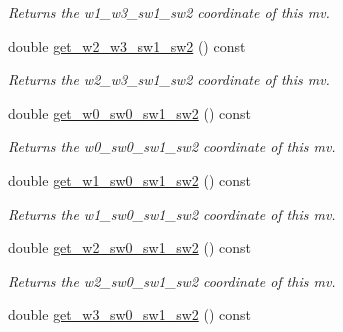 \begin{DoxyCompactItemize}
\begin{DoxyCompactList}\small\item\em Returns the w1\-\_\-w3\-\_\-sw1\-\_\-sw2 coordinate of this mv. \end{DoxyCompactList}\item 
\hypertarget{classe3ga_1_1mv_af2d947f3bb0e4a9ad7f208965ed67568}{double \hyperlink{classe3ga_1_1mv_af2d947f3bb0e4a9ad7f208965ed67568}{get\-\_\-w2\-\_\-w3\-\_\-sw1\-\_\-sw2} () const }\label{classe3ga_1_1mv_af2d947f3bb0e4a9ad7f208965ed67568}

\begin{DoxyCompactList}\small\item\em Returns the w2\-\_\-w3\-\_\-sw1\-\_\-sw2 coordinate of this mv. \end{DoxyCompactList}\item 
\hypertarget{classe3ga_1_1mv_a2bc46b03eaa54ba119cb94811b6cff18}{double \hyperlink{classe3ga_1_1mv_a2bc46b03eaa54ba119cb94811b6cff18}{get\-\_\-w0\-\_\-sw0\-\_\-sw1\-\_\-sw2} () const }\label{classe3ga_1_1mv_a2bc46b03eaa54ba119cb94811b6cff18}

\begin{DoxyCompactList}\small\item\em Returns the w0\-\_\-sw0\-\_\-sw1\-\_\-sw2 coordinate of this mv. \end{DoxyCompactList}\item 
\hypertarget{classe3ga_1_1mv_ac989f02b7e875e0335680b6b756e1bd0}{double \hyperlink{classe3ga_1_1mv_ac989f02b7e875e0335680b6b756e1bd0}{get\-\_\-w1\-\_\-sw0\-\_\-sw1\-\_\-sw2} () const }\label{classe3ga_1_1mv_ac989f02b7e875e0335680b6b756e1bd0}

\begin{DoxyCompactList}\small\item\em Returns the w1\-\_\-sw0\-\_\-sw1\-\_\-sw2 coordinate of this mv. \end{DoxyCompactList}\item 
\hypertarget{classe3ga_1_1mv_a1610cc9a1e4a9a004dcc1596c810661d}{double \hyperlink{classe3ga_1_1mv_a1610cc9a1e4a9a004dcc1596c810661d}{get\-\_\-w2\-\_\-sw0\-\_\-sw1\-\_\-sw2} () const }\label{classe3ga_1_1mv_a1610cc9a1e4a9a004dcc1596c810661d}

\begin{DoxyCompactList}\small\item\em Returns the w2\-\_\-sw0\-\_\-sw1\-\_\-sw2 coordinate of this mv. \end{DoxyCompactList}\item 
\hypertarget{classe3ga_1_1mv_a10fcd586d842188fb9597505cd1a2f9a}{double \hyperlink{classe3ga_1_1mv_a10fcd586d842188fb9597505cd1a2f9a}{get\-\_\-w3\-\_\-sw0\-\_\-sw1\-\_\-sw2} () const }\label{classe3ga_1_1mv_a10fcd586d842188fb9597505cd1a2f9a}


\end{DoxyCompactItemize}
